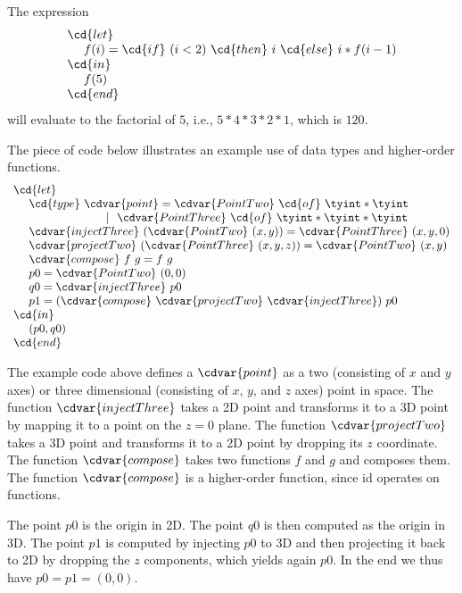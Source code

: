 \begin{example}
The expression
%
\[
\begin{array}{l}
\cd{let}\\
~~~~f(i) = \cd{if} ~(i < 2) ~\cd{then}~ i ~\cd{else}~ i  * 
f(i - 1) \\
\cd{in} \\ 
~~~~f(5) \\
\cd{end} 
\end{array}
\]
will evaluate to the factorial of $5$, i.e., $5 * 4 * 3 * 2
* 1$, which is $120$.
\end{example}


\begin{example}
The piece of code below illustrates an example use of data types and
higher-order functions.
%
\[
\begin{array}{l}
\cd{let}
\\ 
~~~~\cd{type}~\cdvar{point} = \cdvar{PointTwo}~\cd{of}~\tyint * \tyint
\\ 
~~~~~~~~~~~~~~~~~~~~~~~~|~~\cdvar{PointThree}~\cd{of}~ \tyint * \tyint * \tyint
\\
~~~~\cdvar{injectThree}~(\cdvar{PointTwo}~(x, y)) = \cdvar{PointThree}~(x, y, 0)
\\  
~~~~\cdvar{projectTwo}~(\cdvar{PointThree}~(x, y, z)) = \cdvar{PointTwo}~(x, y)
\\ 
~~~~\cdvar{compose}~f~g = f~g  
\\
~~~~p0 = \cdvar{PointTwo}~(0,0)
\\
~~~~q0 = \cdvar{injectThree}~p0
\\
~~~~p1 = (\cdvar{compose}~\cdvar{projectTwo}~\cdvar{injectThree})~p0
\\
\cd{in} 
\\
~~~~(p0, q0)
\\
\cd{end}
\end{array}
\]

The example code above defines a $\cdvar{point}$ as a two (consisting of
$x$ and $y$ axes) or three dimensional (consisting of $x$, $y$, and
$z$ axes) point in space.
%
The function $\cdvar{injectThree}$ takes a 2D point and transforms it to a 3D
point by mapping it to a point on the $z=0$ plane. 
%
The function $\cdvar{projectTwo}$ takes a 3D point and transforms it to a 2D
point by dropping its $z$ coordinate.
%
The function $\cdvar{compose}$ takes two functions $f$ and $g$ and composes
them.
%
The function $\cdvar{compose}$ is a higher-order function, since id operates
on functions.

The point $p0$ is the origin in 2D.  The point $q0$ is then computed
as the origin in 3D.  The point $p1$ is computed by injecting $p0$ to
3D and then projecting it back to 2D by dropping the $z$ components,
which yields again $p0$.  
%
In the end we thus have $p0 = p1 = (0,0)$. 

\end{example}


